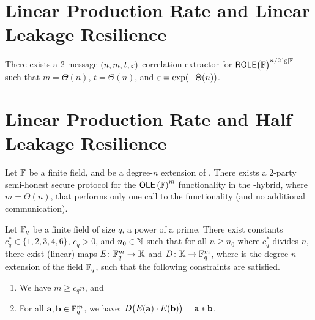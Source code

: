 \documentclass{article}
\begin{document}
\section{Linear Production Rate and Linear Leakage Resilience}
	\begin{theorem}
		\label{thm:main} 
		There exists a 2-message $(n,m,t,\varepsilon)$-correlation extractor for $\ROLE[\bbF]^{n/2\lg\abs\bbF}$  such that $m=\Theta(n)$, $t=\Theta(n)$, and $\varepsilon=\exp(-\Theta(n))$. %
	\end{theorem}

\section{Linear Production Rate and Half Leakage Resilience}

	\begin{theorem}
		\label{thm:embed-low}
		Let ${\mathbb F}$ be a finite field, and \bbK be a degree-$n$ extension of \bbF. 
		There exists a 2-party semi-honest secure protocol for the $\OLE[\bbF]^m$ functionality in the \OLE[\bbK]-hybrid, where $m=\Theta(n)$, that performs only one call to the \OLE[\bbK] functionality (and no additional communication). 
	\end{theorem}

	\begin{theorem}
		\label{thm:embed}
		Let ${\mathbb F}_q$ be a finite field of size $q$, a power of a prime. 
		There exist constants $c_q^* \in \{1,2,3,4,6\}$, $c_q > 0$, and $n_0 \in {\mathbb N}$ such that for all $n \geq n_0$ where $c_q^*$ divides $n$, there exist (linear) maps $E \colon {\mathbb F}^m_{q} \rightarrow {\mathbb K}$ and $D\colon {\mathbb K} \rightarrow {\mathbb F}^m_{q}$, where \bbK is the degree-$n$ extension of the field ${\mathbb F}_q$, such that the following constraints are satisfied.
		\begin{enumerate}
			\item We have $m \geq c_qn$, and
			\item For all ${\mathbf a}, {\mathbf b} \in {\mathbb F}_{q}^m$, we have: 
			$D\big( E({\mathbf a})\cdot E({\mathbf b}) \big) = {\mathbf a}*{\mathbf b}$. 
		\end{enumerate}
	\end{theorem}


\newpage


\end{document}
